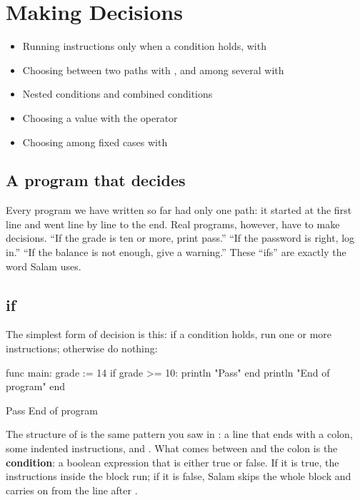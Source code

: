 \chapter{Making Decisions}\label{ch:conditions}

\begin{goals}
\begin{itemize}
  \item Running instructions only when a condition holds, with 
  \item Choosing between two paths with , and among several with
  \item Nested conditions and combined conditions
  \item Choosing a value with the  operator
  \item Choosing among fixed cases with 
\end{itemize}
\end{goals}

\section{A program that decides}

Every program we have written so far had only one path: it started at the
first line and went line by line to the end. Real programs, however, have to
make decisions. ``If the grade is ten or more, print pass.'' ``If the
password is right, log in.'' ``If the balance is not enough, give a
warning.'' These ``ifs'' are exactly the word Salam uses.

\section{if}

The simplest form of decision is this: if a condition holds, run one or more
instructions; otherwise do nothing:

\begin{salamcode}
func main:
    grade := 14
    if grade >= 10:
        println "Pass"
    end
    println "End of program"
end
\end{salamcode}

\begin{salamout}
Pass
End of program
\end{salamout}

The structure of  is the same pattern you saw in :
a line that ends with a colon, some indented instructions, and .
What comes between  and the colon is the \textbf{condition}: a
boolean expression that is either true or false. If it is true, the
instructions inside the block run; if it is false, Salam skips the whole
block and carries on from the line after .

